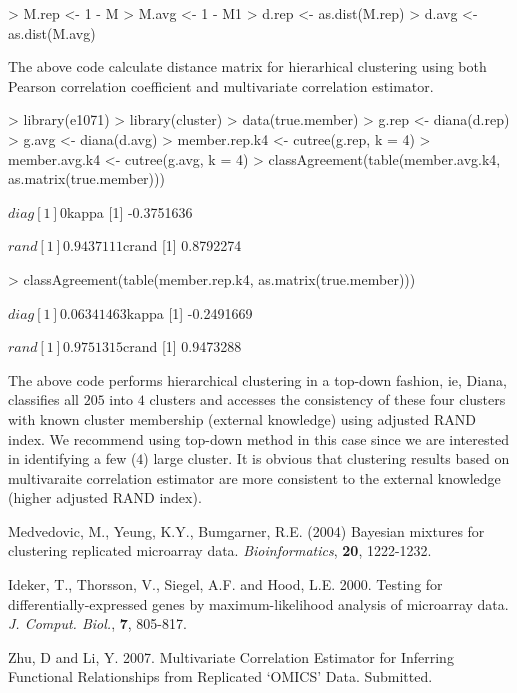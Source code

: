 \documentclass[a4paper]{article}
\begin{document}
\begin{Schunk}
\begin{Sinput}
> M.rep <- 1 - M
> M.avg <- 1 - M1
> d.rep <- as.dist(M.rep)
> d.avg <- as.dist(M.avg)
\end{Sinput}
\end{Schunk}
The above code calculate distance matrix for hierarhical clustering using both
Pearson correlation coefficient and multivariate correlation estimator.
\begin{Schunk}
\begin{Sinput}
> library(e1071)
> library(cluster)
> data(true.member)
> g.rep <- diana(d.rep)
> g.avg <- diana(d.avg)
> member.rep.k4 <- cutree(g.rep, k = 4)
> member.avg.k4 <- cutree(g.avg, k = 4)
> classAgreement(table(member.avg.k4, as.matrix(true.member)))
\end{Sinput}
\begin{Soutput}
$diag
[1] 0

$kappa
[1] -0.3751636

$rand
[1] 0.9437111

$crand
[1] 0.8792274
\end{Soutput}
\begin{Sinput}
> classAgreement(table(member.rep.k4, as.matrix(true.member)))
\end{Sinput}
\begin{Soutput}
$diag
[1] 0.06341463

$kappa
[1] -0.2491669

$rand
[1] 0.9751315

$crand
[1] 0.9473288
\end{Soutput}
\end{Schunk}
The above code performs hierarchical clustering in a top-down fashion, ie, Diana,
classifies all $205$ into $4$ clusters and accesses the consistency of these four
clusters with known cluster membership (external knowledge) using adjusted RAND
index. We recommend using top-down method in this case since we are interested in
identifying a few ($4$) large cluster. It is obvious that clustering results based 
on multivaraite correlation
estimator are more consistent to the external knowledge (higher adjusted RAND index).


\begin{thebibliography}{}
 Medvedovic, M., Yeung, K.Y., Bumgarner, R.E.
(2004) Bayesian mixtures for clustering replicated microarray data.
{\it Bioinformatics}, {\bf 20}, 1222-1232.

 Ideker, T., Thorsson, V., Siegel, A.F. and Hood, L.E. 2000. Testing for differentially-expressed
genes by maximum-likelihood analysis of microarray data. {\it J.
Comput. Biol.}, {\bf 7}, 805-817.

 Zhu, D and Li, Y. 2007. 
Multivariate Correlation Estimator for Inferring Functional Relationships from Replicated `OMICS' Data. Submitted.

\end{thebibliography}
\end{document}

